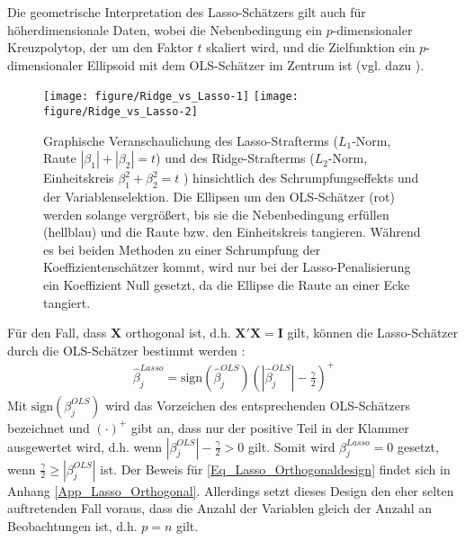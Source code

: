 \documentclass[12pt, a4paper]{report}\usepackage[]{graphicx}\usepackage[]{color}
\newenvironment{knitrout}{}{} %
\begin{document}
Die geometrische Interpretation des Lasso-Schätzers gilt auch für höherdimensionale Daten, wobei die Nebenbedingung ein $p$-dimensionaler Kreuzpolytop, der um den Faktor $t$ skaliert wird, und die Zielfunktion ein $p$-dimensionaler Ellipsoid mit dem OLS-Schätzer im Zentrum ist (vgl. dazu ).\\
\begin{knitrout}
\color{fgcolor}\begin{figure}[H]


{\centering \texttt{[image: figure/Ridge\_vs\_Lasso-1]} 
\texttt{[image: figure/Ridge\_vs\_Lasso-2]} 

}

\caption[Graphische Veranschaulichung des Lasso- und Ridge-Strafterms]{Graphische Veranschaulichung des Lasso-Strafterms ($L_1$-Norm, Raute $|\beta_1|+|\beta_2|=t$) und des Ridge-Strafterms ($L_2$-Norm, Einheitskreis $ \beta_1^2 + \beta_2^2 = t$ ) hinsichtlich des Schrumpfungseffekts und der Variablenselektion. Die Ellipsen um den OLS-Schätzer (rot) werden solange vergrößert, bis sie die Nebenbedingung erfüllen (hellblau) und die Raute bzw. den Einheitskreis tangieren. Während es bei beiden Methoden zu einer Schrumpfung der Koeffizientenschätzer kommt, wird nur bei der Lasso-Penalisierung ein Koeffizient Null gesetzt, da die Ellipse die Raute an einer Ecke tangiert.\label{fig:Ridge_vs_Lasso}}
\end{figure}


\end{knitrout}
Für den Fall, dass $\mathbf{X}$ orthogonal ist, d.h. $\mathbf{X}'\mathbf{X}=\mathbf{I}$ gilt, können die Lasso-Schätzer durch die OLS-Schätzer bestimmt werden \cite{tibshirani96regression}:
\begin{align}\label{Eq_Lasso_Orthogonaldesign}
\hat{\beta}_j^{Lasso}=\text{sign}(\hat{\beta}_j^{OLS})(|\hat{\beta}_j^{OLS}|-\frac{\gamma}{2})^+
\end{align}
Mit $\text{sign}(\beta_j^{OLS})$ wird das Vorzeichen des entsprechenden OLS-Schätzers bezeichnet und $(\cdot)^+$ gibt an, dass nur der positive Teil in der Klammer ausgewertet wird, d.h. wenn $|\beta_j^{OLS}|-\frac{\gamma}{2} > 0$ gilt. Somit wird $\beta_j^{Lasso} = 0$ gesetzt, wenn $\frac{\gamma}{2} \ge |\beta_j^{OLS}|$ ist. Der Beweis für \eqref{Eq_Lasso_Orthogonaldesign} findet sich in Anhang \ref{App_Lasso_Orthogonal}. Allerdings setzt dieses Design den eher selten auftretenden Fall voraus, dass die Anzahl der Variablen gleich der Anzahl an Beobachtungen ist, d.h. $p=n$ gilt.\\
\end{document}
